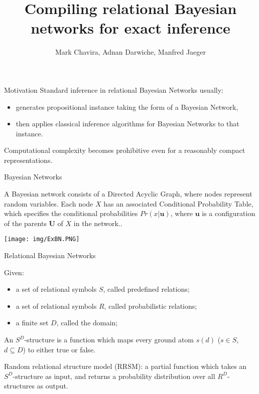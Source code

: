 \documentclass[xcolor={table}]{beamer}
\title[NISL Final Presentation]{Compiling relational Bayesian networks for exact inference}
\author[]{Mark Chavira, Adnan Darwiche, Manfred Jaeger}
\date{}
\begin{document}
\begin{frame}
\titlepage
\end{frame}

\begin{frame}{Motivation}
Standard inference in relational Bayesian Networks usually:
\begin{itemize}
\item generates propositional instance taking the form of a Bayesian Network,
\item then applies classical inference algorithms for Bayesian Networks to that instance.
\end{itemize}
Computational complexity becomes prohibitive even for a reasonably compact representations.
\end{frame}

\begin{frame}{Bayesian Networks}
\begin{block}{}
A Bayesian network consists of a Directed Acyclic Graph, where nodes represent random variables. Each node $\mathit{X}$ has an associated Conditional Probability Table, which specifies the conditional probabilities  $Pr(x|\mathbf{u})$, where $\mathbf{u}$ is a configuration of the parents $\mathbf{U}$ of $X$ in the network..
\end{block}
\texttt{[image: img/ExBN.PNG]}
\end{frame}

\begin{frame}{Relational Bayesian Networks}
\begin{block}{}
Given:
\begin{itemize}
\item a set of relational symbols $S$, called predefined relations;
\item a set of relational symbols $R$, called probabilistic relations;
\item a finite set $D$, called the domain;
\end{itemize}
An $S^{D}$-structure is a function which maps every ground atom $s(d)$ ($s \in S$, $d \subseteq D$) to either true or false.
\end{block}
Random relational structure model (RRSM): a partial function which takes an $S^{D}$-structure %
as input, and returns a probability distribution over all $R^{D}$-structures as output.
\end{frame}
\end{document}
